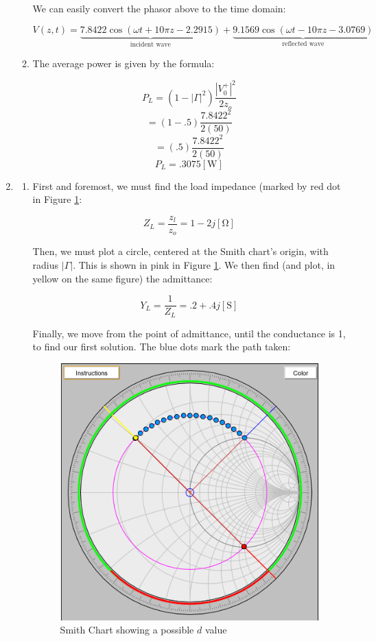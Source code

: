 \begin{enumerate}
\begin{enumerate}
        We can easily convert the phasor above to the time domain:

        $$\boxed{V(z,t)=\underbrace{7.8422\cos(\omega t+10\pi z-2.2915)}_{\text{incident wave}}+\underbrace{9.1569\cos(\omega t-10\pi z-3.0769)}_{\text{reflected wave}}}$$

      \item 

        The average power is given by the formula:

        $$P_L=(1-|\Gamma|^2)\frac{|V_0^+|^2}{2z_o}$$
        $$=(1-.5)\frac{7.8422^2}{2(50)}$$
        $$=(.5)\frac{7.8422^2}{2(50)}$$
        $$\boxed{P_L=.3075[\si{\watt}]}$$

    \end{enumerate}

  \item

    \begin{enumerate}
        
      \item 

        First and foremost, we must find the load impedance (marked by red dot in Figure \ref{fig:1}:

          $$Z_L=\frac{z_l}{z_o}=1-2j[\si{\ohm}]$$

          Then, we must plot a circle, centered at the Smith chart's origin, with radius $|\Gamma|$. This is shown in pink in Figure \ref{fig:1}. We then find (and plot, in yellow on the same figure) the admittance:

          $$Y_L=\frac{1}{Z_L}=.2+.4j[\text{S}]$$

          Finally, we move from the point of admittance, until the conductance is 1, to find our first solution. The blue dots mark the path taken:

          \begin{figure}[h!]
            \centering
            \includegraphics[width=.6\textwidth]{Figures/DValue.png}
            \caption{Smith Chart showing a possible $d$ value}
            \label{fig:1}
          \end{figure}


\end{enumerate}
\end{enumerate}
